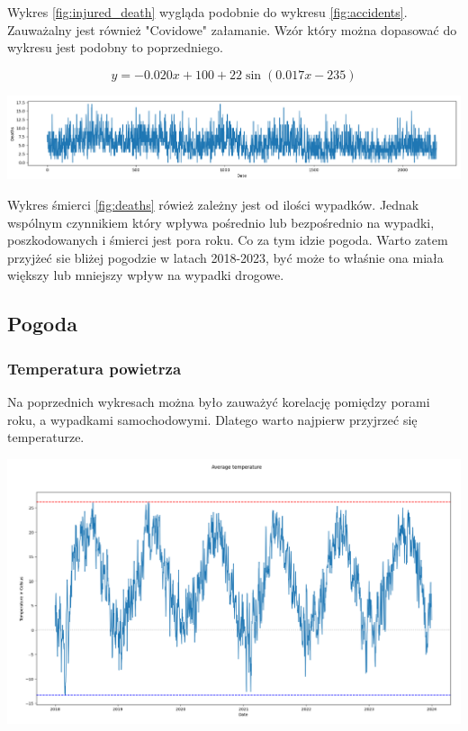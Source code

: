 \documentclass{article}
\begin{document}
Wykres \ref{fig:injured_death} wygląda podobnie do wykresu \ref{fig:accidents}. Zauważalny jest również "Covidowe" załamanie. Wzór który można dopasować do wykresu jest podobny to poprzedniego.

\begin{equation} \label{eq:sin_equation2}
    y = -0.020x + 100 + 22\sin(0.017x - 235) 
\end{equation}


 \begin{center}
    \includegraphics[scale=0.4]{visualization/deaths.png}
    \captionsetup{hypcap=false}
    \label{fig:deaths}
\end{center}

Wykres śmierci \ref{fig:deaths} rówież zależny jest od ilości wypadków. Jednak wspólnym czynnikiem który wpływa pośrednio lub bezpośrednio na wypadki, poszkodowanych i śmierci jest pora roku. Co za tym idzie pogoda. Warto zatem przyjżeć sie bliżej pogodzie w latach 2018-2023, być może to właśnie ona miała większy lub mniejszy wpływ na wypadki drogowe. 

\subsection{Pogoda}
\subsubsection{Temperatura powietrza}
Na poprzednich wykresach można było zauważyć korelację pomiędzy porami roku, 
a wypadkami samochodowymi. Dlatego warto najpierw przyjrzeć się temperaturze.

 \begin{center}
    \includegraphics[scale=0.25]{visualization/avg_temp.png}
    \captionsetup{hypcap=false}
    \label{fig:avg_temp}
\end{center}
\end{document}
